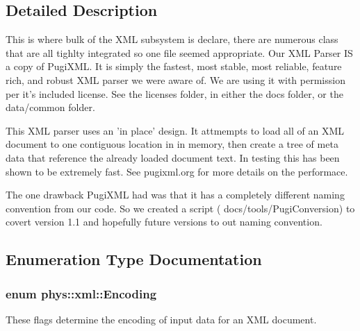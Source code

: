 \subsection{Detailed Description}
This is where bulk of the XML subsystem is declare, there are numerous class that are all tighlty integrated so one file seemed appropriate. Our XML Parser IS a copy of PugiXML. It is simply the fastest, most stable, most reliable, feature rich, and robust XML parser we were aware of. We are using it with permission per it's included license. See the licenses folder, in either the docs folder, or the data/common folder. \par
 \par
 This XML parser uses an 'in place' design. It attmempts to load all of an XML document to one contiguous location in in memory, then create a tree of meta data that reference the already loaded document text. In testing this has been shown to be extremely fast. See pugixml.org for more details on the performace. \par
 \par
 The one drawback PugiXML had was that it has a completely different naming convention from our code. So we created a script ( docs/tools/PugiConversion) to covert version 1.1 and hopefully future versions to out naming convention. 

\subsection{Enumeration Type Documentation}
\hypertarget{namespacephys_1_1xml_a420f5de782438f88160321385bea2015}{
\subsubsection[{Encoding}]{\setlength{\rightskip}{0pt plus 5cm}enum {\bf phys::xml::Encoding}}}
\label{d9/d27/namespacephys_1_1xml_a420f5de782438f88160321385bea2015}


These flags determine the encoding of input data for an XML document. 

